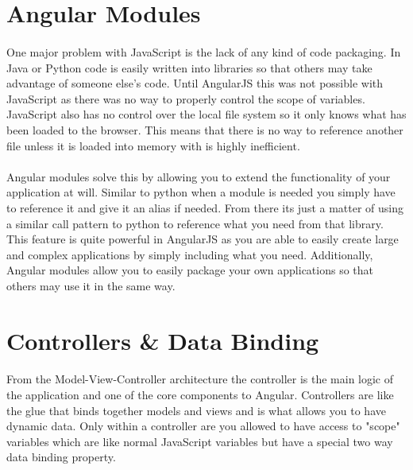 \documentclass[
10pt, %
a4paper, %
oneside, %
headinclude,footinclude, %
BCOR5mm, %
]{scrartcl}
\begin{document}
\section{Angular Modules}
\paragraph{}
One major problem with JavaScript is the lack of any kind of code packaging.
In Java or Python code is easily written into libraries so that others may take advantage of someone else's code.
Until AngularJS this was not possible with JavaScript as there was no way to properly control the scope of variables.
JavaScript also has no control over the local file system so it only knows what has been loaded to the browser.
This means that there is no way to reference another file unless it is loaded into memory with is highly inefficient.

\paragraph{}
Angular modules solve this by allowing you to extend the functionality of your application at will.
Similar to python when a module is needed you simply have to reference it and give it an alias if needed.
From there its just a matter of using a similar call pattern to python to reference what you need from that library.
This feature is quite powerful in AngularJS as you are able to easily create large and complex applications by simply including what you need.
Additionally, Angular modules allow you to easily package your own applications so that others may use it in the same way.

\section{Controllers \& Data Binding}
\paragraph{}
From the Model-View-Controller architecture the controller is the main logic of the application and one of the core components to Angular.
Controllers are like the glue that binds together models and views and is what allows you to have dynamic data.\cite{youtube}
Only within a controller are you allowed to have access to "scope" variables which are like normal JavaScript variables but have a special two way data binding property.
\end{document}
